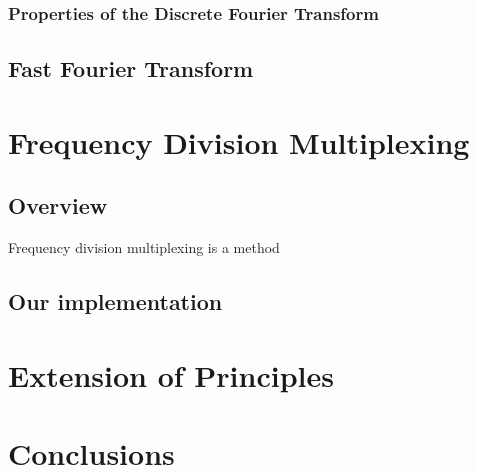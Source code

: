 \documentclass[12pt]{article}
\begin{document}

\subsubsection{Properties of the Discrete Fourier Transform}

\subsection{Fast Fourier Transform}

\section{Frequency Division Multiplexing}

\subsection{Overview}

Frequency division multiplexing is a method 

\subsection{Our implementation}


\section{Extension of Principles}


\section{Conclusions}
\end{document}
